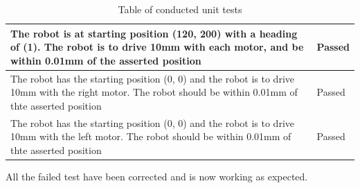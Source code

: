 \begin{table}
\begin{center}
\begin{tabular}{ | p{10cm} | p{5cm} |}
		The robot is at starting position (120, 200) with a heading of (1). The robot is to drive 10mm with each motor, and be within 0.01mm of the asserted position & Passed \\ \hline
		The robot has the starting position (0, 0) and the robot is to drive 10mm with the right motor. The robot should be within 0.01mm of thte asserted position & Passed \\ \hline
		The robot has the starting position (0, 0) and the robot is to drive 10mm with the left motor. The robot should be within 0.01mm of thte asserted position & Passed \\ \hline
	\end{tabular}
	\caption{Table of conducted unit tests}
	\label{table:Unit tests}
\end{center}
\end{table}

All the failed test have been corrected and is now working as expected. 